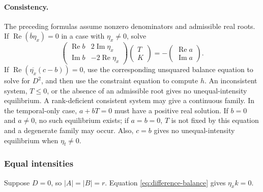 \paragraph{Consistency.}
The preceding formulas assume nonzero denominators and admissible real
roots.  If $\operatorname{Re}(\overline b\eta_x)=0$ in a case with
$\eta_x\neq0$, solve
\begin{equation}
 \begin{pmatrix}
  \operatorname{Re}b&2\operatorname{Im}\eta_x\\
  \operatorname{Im}b&-2\operatorname{Re}\eta_x
 \end{pmatrix}
 \begin{pmatrix}T\\K\end{pmatrix}
 =-
 \begin{pmatrix}\operatorname{Re}a\\\operatorname{Im}a\end{pmatrix}.
 \label{eq:TK-degenerate}
\end{equation}
If $\operatorname{Re}(\overline{\eta_x}(c-b))=0$, use the corresponding
unsquared balance equation to solve for $D^2$, and then use the constraint
equation to compute $h$.  An inconsistent system, $T\leq0$, or the absence
of an admissible root gives no unequal-intensity equilibrium.  A
rank-deficient consistent system may give a continuous family.  In the
temporal-only case, $a+bT=0$ must have a positive real solution.  If $b=0$
and $a\neq0$, no such equilibrium exists; if $a=b=0$, $T$ is not fixed by
this equation and a degenerate family may occur.  Also, $c=b$ gives no
unequal-intensity equilibrium when $\eta_t\neq0$.

\subsubsection{Equal intensities}

Suppose $D=0$, so $|A|=|B|=r$.  Equation
\eqref{eq:difference-balance} gives $\eta_xk=0$.

